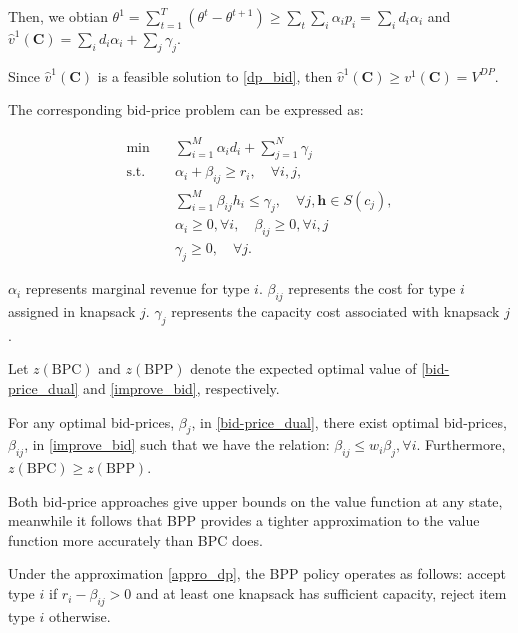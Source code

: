 Then, we obtian $\theta^{1} = \sum_{t=1}^{T} (\theta^{t} - \theta^{t+1}) \geq \sum_{t} \sum_{i} \alpha_{i} p_{i} = \sum_{i} d_{i} \alpha_{i}$ and $\hat{v}^{1}(\bm{C}) = \sum_{i} d_{i} \alpha_{i} + \sum_{j} \gamma_{j}$.

Since $\hat{v}^{1}(\bm{C})$ is a feasible solution to \eqref{dp_bid}, then $\hat{v}^{1}(\bm{C}) \geq v^{1}(\bm{C}) =  V^{DP}$.

The corresponding bid-price problem can be expressed as:

\begin{equation}\label{improve_bid}
    \begin{aligned}
    \min \quad & \sum_{i=1}^M \alpha_i d_i+ \sum_{j=1}^N \gamma_j \\
    \mathrm{s.t.} \quad & \alpha_i+\beta_{i j} \geq r_i, \quad \forall i, j, \\
    & \sum_{i=1}^M \beta_{i j} h_i \leq \gamma_j, \quad \forall j, \bm{h} \in S(c_j), \\
    & \alpha_i \geq 0, \forall i, \quad \beta_{ij} \geq 0, \forall i, j \\
    & \gamma_j \geq 0, \quad \forall j.
    \end{aligned}
\end{equation}

$\alpha_{i}$ represents marginal revenue for type $i$. $\beta_{ij}$ represents the cost for type $i$ assigned in knapsack $j$. $\gamma_{j}$ represents the capacity cost associated with knapsack $j$.

Let $z(\text{BPC})$ and $z(\text{BPP})$ denote the expected optimal value of \eqref{bid-price_dual} and \eqref{improve_bid}, respectively.

\begin{lem}\label{BPC_relation}
    For any optimal bid-prices, $\beta_{j}$, in \eqref{bid-price_dual}, there exist optimal bid-prices, $\beta_{ij}$, in \eqref{improve_bid} such that we have the relation:
    $\beta_{ij} \leq w_{i} \beta_{j}, \forall i$. Furthermore, $z(\text{BPC}) \geq z(\text{BPP})$.
\end{lem}
    
    
Both bid-price approaches give upper bounds on the value function at any state, meanwhile it follows that BPP provides a tighter approximation to the value function more accurately than BPC does.

Under the approximation \eqref{appro_dp}, the BPP policy operates as follows: accept type $i$ if $r_i - \beta_{ij} > 0$ and at least one knapsack has sufficient capacity, reject item type $i$ otherwise. 

